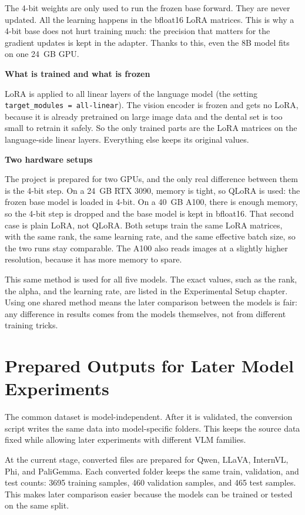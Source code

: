 \documentclass[a4paper,12pt]{report}
\newcommand{\minisection}[1]{%
  \vspace{1ex}
  \noindent\textbf{#1}\par
  \vspace{0.5ex}
}
\begin{document}
The 4-bit weights are only used to run the frozen base forward. They are never updated. All the learning happens in the bfloat16 LoRA matrices. This is why a 4-bit base does not hurt training much: the precision that matters for the gradient updates is kept in the adapter. Thanks to this, even the 8B model fits on one 24~GB GPU.

\minisection{What is trained and what is frozen}

LoRA is applied to all linear layers of the language model (the setting \texttt{target\_modules = all-linear}). The vision encoder is frozen and gets no LoRA, because it is already pretrained on large image data and the dental set is too small to retrain it safely. So the only trained parts are the LoRA matrices on the language-side linear layers. Everything else keeps its original values.

\minisection{Two hardware setups}

The project is prepared for two GPUs, and the only real difference between them is the 4-bit step. On a 24~GB RTX 3090, memory is tight, so QLoRA is used: the frozen base model is loaded in 4-bit. On a 40~GB A100, there is enough memory, so the 4-bit step is dropped and the base model is kept in bfloat16. That second case is plain LoRA, not QLoRA. Both setups train the same LoRA matrices, with the same rank, the same learning rate, and the same effective batch size, so the two runs stay comparable. The A100 also reads images at a slightly higher resolution, because it has more memory to spare.

This same method is used for all five models. The exact values, such as the rank, the alpha, and the learning rate, are listed in the Experimental Setup chapter. Using one shared method means the later comparison between the models is fair: any difference in results comes from the models themselves, not from different training tricks.

\section{Prepared Outputs for Later Model Experiments}

The common dataset is model-independent. After it is validated, the conversion script writes the same data into model-specific folders. This keeps the source data fixed while allowing later experiments with different VLM families.

At the current stage, converted files are prepared for Qwen, LLaVA, InternVL, Phi, and PaliGemma. Each converted folder keeps the same train, validation, and test counts: 3695 training samples, 460 validation samples, and 465 test samples. This makes later comparison easier because the models can be trained or tested on the same split.
\end{document}
